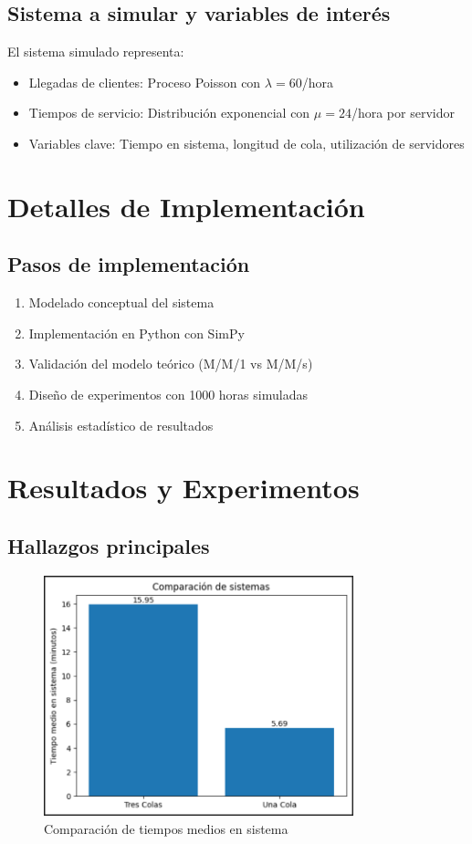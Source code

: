 \documentclass{article}
\begin{document}
\subsection{Sistema a simular y variables de interés}
El sistema simulado representa:
\begin{itemize}
\item Llegadas de clientes: Proceso Poisson con $\lambda = 60$/hora
\item Tiempos de servicio: Distribución exponencial con $\mu = 24$/hora por servidor
\item Variables clave: Tiempo en sistema, longitud de cola, utilización de servidores
\end{itemize}

\newpage

\section{Detalles de Implementación}\label{sec:implementacion}
\subsection{Pasos de implementación}
\begin{enumerate}
\item Modelado conceptual del sistema
\item Implementación en Python con SimPy
\item Validación del modelo teórico (M/M/1 vs M/M/s)
\item Diseño de experimentos con 1000 horas simuladas
\item Análisis estadístico de resultados
\end{enumerate}

\newpage

\section{Resultados y Experimentos}\label{sec:resultados}
\subsection{Hallazgos principales}
\begin{figure}[h]
\centering
\includegraphics[width=0.8\textwidth]{./images/comparacion_colas.png}
\caption{Comparación de tiempos medios en sistema}
\label{fig:resultados}
\end{figure}
\end{document}
